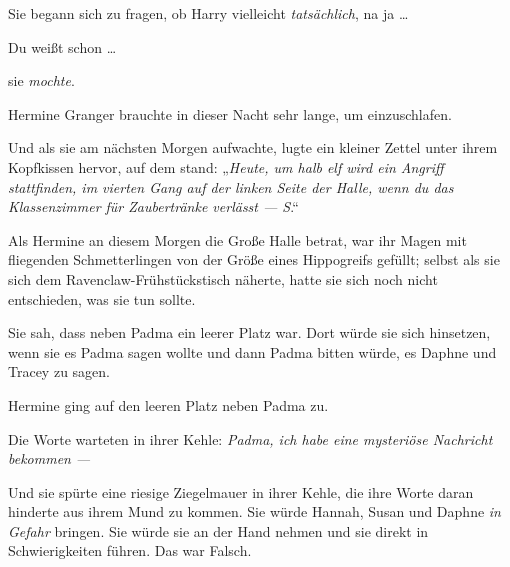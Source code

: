 Sie begann sich zu fragen, ob Harry vielleicht \emph{tatsächlich}, na ja …

Du weißt schon …

sie \emph{mochte}.

Hermine Granger brauchte in dieser Nacht sehr lange, um einzuschlafen.

Und als sie am nächsten Morgen aufwachte, lugte ein kleiner Zettel unter ihrem Kopfkissen hervor, auf dem stand:
„\emph{Heute, um halb elf wird ein Angriff stattfinden, im vierten Gang auf der linken Seite der Halle, wenn du das Klassenzimmer für Zaubertränke verlässt — S}.“

\later

Als Hermine an diesem Morgen die Große Halle betrat, war ihr Magen mit fliegenden Schmetterlingen von der Größe eines Hippogreifs gefüllt; selbst als sie sich dem Ravenclaw-Frühstückstisch näherte, hatte sie sich noch nicht entschieden, was sie tun sollte.

Sie sah, dass neben Padma ein leerer Platz war. Dort würde sie sich hinsetzen, wenn sie es Padma sagen wollte und dann Padma bitten würde, es Daphne und Tracey zu sagen.

Hermine ging auf den leeren Platz neben Padma zu.

Die Worte warteten in ihrer Kehle: \emph{Padma, ich habe eine mysteriöse Nachricht bekommen} \emph{—}

Und sie spürte eine riesige Ziegelmauer in ihrer Kehle, die ihre Worte daran hinderte aus ihrem Mund zu kommen. Sie würde Hannah, Susan und Daphne \emph{in Gefahr} bringen. Sie würde sie an der Hand nehmen und sie direkt in Schwierigkeiten führen. Das war Falsch.

